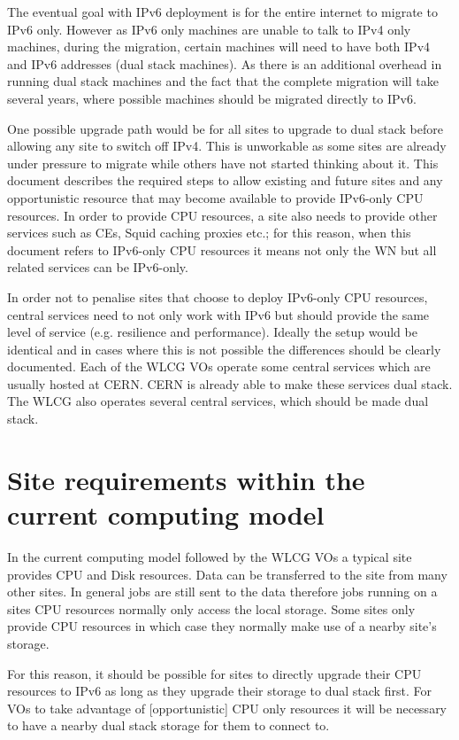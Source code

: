 \documentclass[11pt]{article}
\begin{document}
The eventual goal with IPv6 deployment is for the entire internet to migrate to IPv6 only.  However as IPv6 only machines are unable to talk to IPv4 only machines, during the migration, certain machines will need to have both IPv4 and IPv6 addresses (dual stack machines).  As there is an additional overhead in running dual stack machines and the fact that the complete migration will take several years, where possible machines should be migrated directly to IPv6.  

One possible upgrade path would be for all sites to upgrade to dual stack before allowing any site to switch off IPv4.  This is unworkable as some sites are already under pressure to migrate while others have not started thinking about it.   This document describes the required steps to allow existing and future sites and any opportunistic resource that may become available to provide IPv6-only CPU resources. In order to provide CPU resources, a site also needs to provide other services such as CEs, Squid caching proxies etc.; for this reason, when this document refers to IPv6-only CPU resources it means not only the WN but all related services can be IPv6-only.

In order not to penalise sites that choose to deploy IPv6-only CPU resources, central services need to not only work with IPv6 but should provide the same level of service (e.g. resilience and performance).  Ideally the setup would be identical and in cases where this is not possible the differences should be clearly documented.  Each of the WLCG VOs operate some central services which are usually hosted at CERN. CERN is already able to make these services dual stack. The WLCG also operates several central services, which should be made dual stack.

\section{Site requirements within the current computing model}
In the current computing model followed by the WLCG VOs a typical site provides CPU and Disk resources.  Data can be transferred to the site from many other sites.  In general jobs are still sent to the data therefore jobs running on a sites CPU resources normally only access the local storage.  Some sites only provide CPU resources in which case they normally make use of a nearby site's storage.  

For this reason, it should be possible for sites to directly upgrade their CPU resources to IPv6 as long as they upgrade their storage to dual stack first.  For VOs to take advantage of [opportunistic] CPU only resources it will be necessary to have a nearby dual stack storage for them to connect to.
\end{document}
